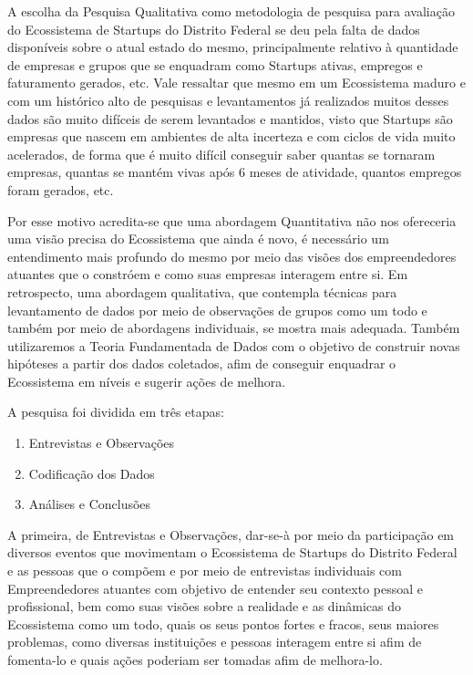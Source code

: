 A escolha da Pesquisa Qualitativa como metodologia de pesquisa para avaliação do Ecossistema de Startups do Distrito Federal se deu pela falta de dados disponíveis sobre o atual estado do mesmo,
principalmente relativo à quantidade de empresas e grupos que se enquadram como Startups ativas, empregos e faturamento gerados, etc. Vale ressaltar que mesmo em um Ecossistema maduro e com um histórico
alto de pesquisas e levantamentos já realizados muitos desses dados são muito difíceis de serem levantados e mantidos, visto que Startups são empresas que nascem em ambientes de alta incerteza e
com ciclos de vida muito acelerados, de forma que é muito difícil conseguir saber quantas se tornaram empresas, quantas se mantém vivas após 6 meses de atividade, quantos empregos foram gerados, etc.

Por esse motivo acredita-se que uma abordagem Quantitativa não nos ofereceria uma visão precisa do Ecossistema que ainda é novo, é necessário um entendimento mais profundo do mesmo por meio das
visões dos empreendedores atuantes que o constróem e como suas empresas interagem entre si. Em retrospecto, uma abordagem qualitativa, que contempla técnicas para levantamento de dados por meio
de observações de grupos como um todo e também por meio de abordagens individuais, se mostra mais adequada. Também utilizaremos a Teoria Fundamentada de Dados com o objetivo de construir novas hipóteses a partir dos dados coletados, afim de conseguir enquadrar o Ecossistema em níveis e sugerir ações
de melhora.

A pesquisa foi dividida em três etapas:

\begin{enumerate}
  \item Entrevistas e Observações
  \item Codificação dos Dados
  \item Análises e Conclusões
\end{enumerate}

A primeira, de Entrevistas e Observações, dar-se-à por meio da participação em diversos eventos que movimentam o Ecossistema de Startups do Distrito Federal e as pessoas que o compõem e por meio
de entrevistas individuais com Empreendedores atuantes com objetivo de entender seu contexto pessoal e profissional, bem como suas visões sobre a realidade e as dinâmicas do Ecossistema como um todo,
quais os seus pontos fortes e fracos, seus maiores problemas, como diversas instituições e pessoas interagem entre si afim de fomenta-lo e quais ações poderiam ser tomadas afim de melhora-lo.

